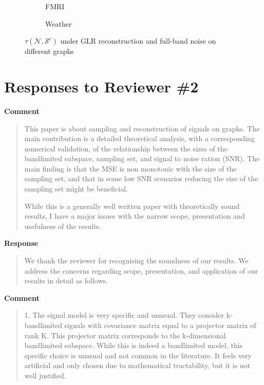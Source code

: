 \documentclass[11pt,onecolumn,journal]{IEEEtran}
\theoremstyle{definition}
\newcommand{\set}[1]{\mathcal{#1}}
\begin{document}
\begin{figure}[h!]%
    \centering
    \begin{subfigure}{0.4\columnwidth}
    \caption{FMRI}
    \label{r1tau_FMRI_GLR}
    \end{subfigure}\hfill
    \begin{subfigure}{0.4\columnwidth}
    \caption{Weather}
    \label{r1GLR_MSE_subfigb}%
    \end{subfigure}
    \caption{$\tau(\set{N},\set{S}^{c})$ under GLR reconstruction and full-band noise on different graphs }
\label{r1fig:GLR_tau_real}
\end{figure}


\newpage
\section*{Responses to Reviewer \#2}
\textbf{Comment}
\begin{quote}
This paper is about sampling and reconstruction of signals on graphs. The main contribution is a detailed theoretical analysis, with a corresponding numerical validation, of the relationship between the sizes of the bandlimited subspace, sampling set, and signal to noise ration (SNR). The main finding is that the MSE is non monotonic with the size of the sampling set, and that in some low SNR scenarios reducing the size of the sampling set might be beneficial.

While this is a generally well written paper with theoretically sound results, I have a major issues with the narrow scope, presentation and usefulness of the results.
\end{quote}

\textbf{Response}
\begin{quote}
We thank the reviewer for recognising the soundness of our results. We address the concerns regarding scope, presentation, and application of our results in detail as follows.
\end{quote}

\textbf{Comment}
\begin{quote}
1. The signal model is very specific and unusual. They consider k-bandlimited signals with covariance matrix equal to a projector matrix of rank K. This projector matrix corresponds to the k-dimensional bandlimited subspace. While this is indeed a bandlimited model, this specific choice is unusual and not common in the literature. It feels very artificial and only chosen due to mathematical tractability, but it is not well justified.  
\end{quote}
\end{document}
